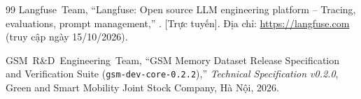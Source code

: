 \documentclass[a4paper,11pt]{article}
\begin{document}
\begin{thebibliography}{99}
Langfuse~Team,
\newblock ``Langfuse: Open source LLM engineering platform -- Tracing, evaluations, prompt management,''
. [Trực tuyến]. Địa chỉ: \url{https://langfuse.com} (truy cập ngày 15/10/2026).

GSM~R\&D~Engineering~Team,
\newblock ``GSM Memory Dataset Release Specification and Verification Suite (\texttt{gsm-dev-core-0.2.2}),''
\newblock \emph{Technical Specification v0.2.0}, Green and Smart Mobility Joint Stock Company, Hà Nội, 2026.

\end{thebibliography}
\end{document}
